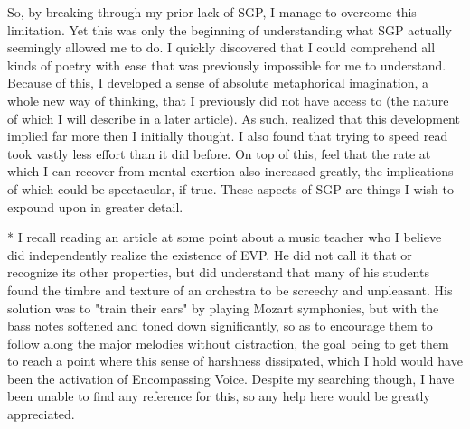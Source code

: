 \documentclass[]{article}
\begin{document}
So, by breaking through my prior lack of SGP, I manage to overcome this limitation. Yet this was only the beginning of understanding what SGP actually seemingly allowed me to do. I quickly discovered that I could comprehend all kinds of poetry with ease that was previously impossible for me to understand. Because of this, I developed a sense of absolute metaphorical imagination, a whole new way of thinking, that I previously did not have access to (the nature of which I will describe in a later article). As such, realized that this development implied far more then I initially thought. I also found that trying to speed read took vastly less effort than it did before. On top of this, feel that the rate at which I can recover from mental exertion also increased greatly, the implications of which could be spectacular, if true. These aspects of SGP are things I wish to expound upon in greater detail.


* I recall reading an article at some point about a music teacher who I believe did independently realize the existence of EVP. He did not call it that or recognize its other properties, but did understand that many of his students found the timbre and texture of an orchestra to be screechy and unpleasant. His solution was to "train their ears" by playing Mozart symphonies, but with the bass notes softened and toned down significantly, so as to encourage them to follow along the major melodies without distraction, the goal being to get them to reach a point where this sense of harshness dissipated, which I hold would have been the activation of Encompassing Voice. Despite my searching though, I have been unable to find any reference for this, so any help here would be greatly appreciated.
\end{document}
